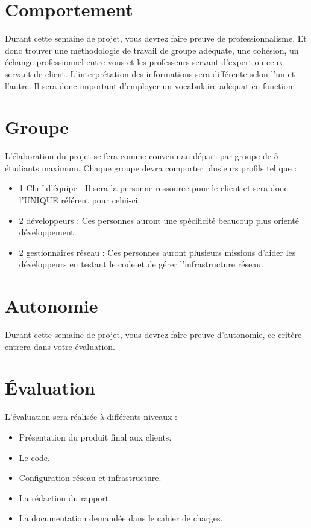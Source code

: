 \documentclass[a4paper,12pt]{report}
\begin{document}
\section{Comportement}
Durant cette semaine de projet, vous devrez faire preuve de professionnalisme. Et donc trouver une méthodologie de travail de groupe adéquate, une cohésion, un échange professionnel entre vous et les professeurs servant d'expert ou ceux servant de client. L'interprétation des informations sera différente selon l'un et l'autre. Il sera donc important d'employer un vocabulaire adéquat en fonction.

\section{Groupe}
L'élaboration du projet se fera comme convenu au départ par groupe de 5 étudiants maximum. Chaque groupe devra comporter plusieurs profils tel que :
\begin{itemize}
    \item 1 Chef d'équipe : Il sera la personne ressource pour le client et sera donc l'UNIQUE référent pour celui-ci.
    \item 2 développeurs : Ces personnes auront une spécificité beaucoup plus orienté développement.
    \item 2 gestionnaires réseau : Ces personnes auront plusieurs missions d'aider les développeurs en testant le code et de gérer l'infrastructure réseau.
\end{itemize}

\section{Autonomie}
Durant cette semaine de projet, vous devrez faire preuve d'autonomie, ce critère entrera dans votre évaluation.

\section{Évaluation}
L'évaluation sera réalisée à différents niveaux :
\begin{itemize}
    \item Présentation du produit final aux clients.
    \item Le code.
    \item Configuration réseau et infrastructure.
    \item La rédaction du rapport.
    \item La documentation demandée dans le cahier de charges.
\end{itemize}
\end{document}
